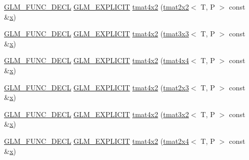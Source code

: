\begin{DoxyCompactItemize}
\item 
\mbox{\hyperlink{setup_8hpp_ab2d052de21a70539923e9bcbf6e83a51}{G\+L\+M\+\_\+\+F\+U\+N\+C\+\_\+\+D\+E\+CL}} \mbox{\hyperlink{setup_8hpp_a6c74f5a5e7b134ab69023ff9a30d4d5d}{G\+L\+M\+\_\+\+E\+X\+P\+L\+I\+C\+IT}} \mbox{\hyperlink{structglm_1_1tmat4x2_adf75877dc039cf1917ba16de5be8510e}{tmat4x2}} (\mbox{\hyperlink{structglm_1_1tmat2x2}{tmat2x2}}$<$ T, P $>$ const \&\mbox{\hyperlink{glad_8h_a92d0386e5c19fb81ea88c9f99644ab1d}{x}})
\item 
\mbox{\hyperlink{setup_8hpp_ab2d052de21a70539923e9bcbf6e83a51}{G\+L\+M\+\_\+\+F\+U\+N\+C\+\_\+\+D\+E\+CL}} \mbox{\hyperlink{setup_8hpp_a6c74f5a5e7b134ab69023ff9a30d4d5d}{G\+L\+M\+\_\+\+E\+X\+P\+L\+I\+C\+IT}} \mbox{\hyperlink{structglm_1_1tmat4x2_ac17d0b3d38b30480a59583b8821fe5c2}{tmat4x2}} (\mbox{\hyperlink{structglm_1_1tmat3x3}{tmat3x3}}$<$ T, P $>$ const \&\mbox{\hyperlink{glad_8h_a92d0386e5c19fb81ea88c9f99644ab1d}{x}})
\item 
\mbox{\hyperlink{setup_8hpp_ab2d052de21a70539923e9bcbf6e83a51}{G\+L\+M\+\_\+\+F\+U\+N\+C\+\_\+\+D\+E\+CL}} \mbox{\hyperlink{setup_8hpp_a6c74f5a5e7b134ab69023ff9a30d4d5d}{G\+L\+M\+\_\+\+E\+X\+P\+L\+I\+C\+IT}} \mbox{\hyperlink{structglm_1_1tmat4x2_a746f9d523f75bee0286be20a38293a2d}{tmat4x2}} (\mbox{\hyperlink{structglm_1_1tmat4x4}{tmat4x4}}$<$ T, P $>$ const \&\mbox{\hyperlink{glad_8h_a92d0386e5c19fb81ea88c9f99644ab1d}{x}})
\item 
\mbox{\hyperlink{setup_8hpp_ab2d052de21a70539923e9bcbf6e83a51}{G\+L\+M\+\_\+\+F\+U\+N\+C\+\_\+\+D\+E\+CL}} \mbox{\hyperlink{setup_8hpp_a6c74f5a5e7b134ab69023ff9a30d4d5d}{G\+L\+M\+\_\+\+E\+X\+P\+L\+I\+C\+IT}} \mbox{\hyperlink{structglm_1_1tmat4x2_acecefe71f4a19f72cf988f0858036d5f}{tmat4x2}} (\mbox{\hyperlink{structglm_1_1tmat2x3}{tmat2x3}}$<$ T, P $>$ const \&\mbox{\hyperlink{glad_8h_a92d0386e5c19fb81ea88c9f99644ab1d}{x}})
\item 
\mbox{\hyperlink{setup_8hpp_ab2d052de21a70539923e9bcbf6e83a51}{G\+L\+M\+\_\+\+F\+U\+N\+C\+\_\+\+D\+E\+CL}} \mbox{\hyperlink{setup_8hpp_a6c74f5a5e7b134ab69023ff9a30d4d5d}{G\+L\+M\+\_\+\+E\+X\+P\+L\+I\+C\+IT}} \mbox{\hyperlink{structglm_1_1tmat4x2_a0a7ddc1c8f35c932b5b4084fe83d6d89}{tmat4x2}} (\mbox{\hyperlink{structglm_1_1tmat3x2}{tmat3x2}}$<$ T, P $>$ const \&\mbox{\hyperlink{glad_8h_a92d0386e5c19fb81ea88c9f99644ab1d}{x}})
\item 
\mbox{\hyperlink{setup_8hpp_ab2d052de21a70539923e9bcbf6e83a51}{G\+L\+M\+\_\+\+F\+U\+N\+C\+\_\+\+D\+E\+CL}} \mbox{\hyperlink{setup_8hpp_a6c74f5a5e7b134ab69023ff9a30d4d5d}{G\+L\+M\+\_\+\+E\+X\+P\+L\+I\+C\+IT}} \mbox{\hyperlink{structglm_1_1tmat4x2_ad48b340a40204cd9b05cf0b7233cccb4}{tmat4x2}} (\mbox{\hyperlink{structglm_1_1tmat2x4}{tmat2x4}}$<$ T, P $>$ const \&\mbox{\hyperlink{glad_8h_a92d0386e5c19fb81ea88c9f99644ab1d}{x}})

\end{DoxyCompactItemize}
